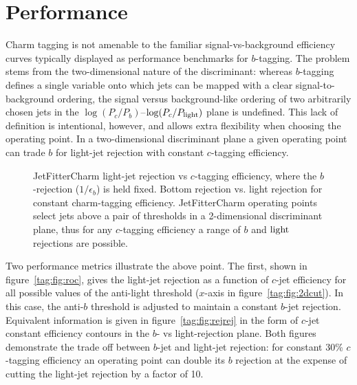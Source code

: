
\section{Performance}
Charm tagging is not amenable to the familiar signal-vs-background efficiency curves typically displayed as performance benchmarks for $b$-tagging. The problem stems from the two-dimensional nature of the discriminant: whereas $b$-tagging defines a single variable onto which jets can be mapped with a clear signal-to-background ordering, the signal versus background-like ordering of two arbitrarily chosen jets in the $\log (P_c/P_b)$--$\log (P_c/P_{\rm light})$ plane is undefined. This lack of definition is intentional, however, and allows extra flexibility when choosing the operating point. In a two-dimensional discriminant plane a given operating point can trade $b$ for light-jet rejection with constant $c$-tagging efficiency.

\begin{figure}
  \begin{center}
  \caption[Several ROC curves for various $b$-jet rejections]{
     JetFitterCharm light-jet rejection vs $c$-tagging efficiency, where the $b$-rejection ($1/\epsilon_b$) is held fixed.
     Bottom rejection vs. light rejection for constant charm-tagging efficiency. JetFitterCharm operating points select jets above a pair of thresholds in a 2-dimensional discriminant plane, thus for any $c$-tagging efficiency a range of $b$ and $\rm light$ rejections are possible.}
  \end{center}
\end{figure}

Two performance metrics illustrate the above point. The first, shown in figure~\ref{tag:fig:roc}, gives the light-jet rejection as a function of $c$-jet efficiency for all possible values of the anti-light threshold ($x$-axis in figure~\ref{tag:fig:2dcut}). In this case, the anti-$b$ threshold is adjusted to maintain a constant $b$-jet rejection. Equivalent information is given in figure~\ref{tag:fig:rejrej} in the form of $c$-jet constant efficiency contours in the $b$- vs light-rejection plane. Both figures demonstrate the trade off between $b$-jet and light-jet rejection: for constant 30\% $c$-tagging efficiency an operating point can double its $b$ rejection at the expense of cutting the light-jet rejection by a factor of 10.

